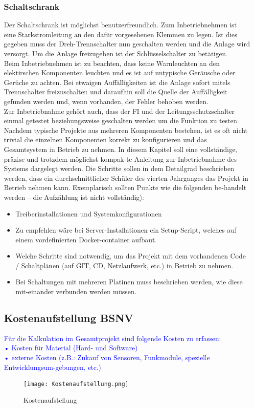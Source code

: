 \subsubsection{Schaltschrank}
    Der Schaltschrank ist möglichst benutzerfreundlich. Zum Inbetriebnehmen ist eine Starkstromleitung an den dafür vorgesehenen Klemmen zu legen. Ist dies gegeben muss der Dreh-Trennschalter nun geschalten werden und die Anlage wird versorgt. Um die Anlage freizugeben ist der Schlüsselschalter zu betätigen.\\
    Beim Inbetriebnehmen ist zu beachten, dass keine Warnleuchten an den elektirschen Komponenten leuchten und es ist auf untypische Geräusche oder Gerüche zu achten. Bei etwaigen Auffälligkeiten ist die Anlage sofort mitels Trennschalter freizuschalten und daraufhin soll die Quelle der Auffälligkeit gefunden werden und, wenn vorhanden, der Fehler behoben werden.\\
    Zur Inbetriebnahme gehört auch, dass der FI und der Leitungsschutzschalter einmal getestet beziehungsweise geschalten werden um die Funktion zu testen.\\
\color{blue}
Nachdem typische Projekte aus mehreren Komponenten bestehen, ist es oft nicht trivial die einzelnen Komponenten korrekt zu konfigurieren und das Gesamtsystem in Betrieb zu nehmen. In diesem Kapitel soll eine vollständige, präzise und trotzdem möglichst kompak-te Anleitung zur Inbetriebnahme des Systems dargelegt werden. Die Schritte sollen in dem Detailgrad beschrieben werden, dass ein durchschnittlicher Schüler des vierten Jahrganges das Projekt in Betrieb nehmen kann. Exemplarisch sollten Punkte wie die folgenden be-handelt werden – die Aufzählung ist nicht vollständig):
\begin{itemize}
    \item Treiberinstallationen und Systemkonfigurationen
    \item Zu empfehlen wäre bei Server-Installationen ein Setup-Script, welches auf einem vordefinierten Docker-container aufbaut.
    \item Welche Schritte sind notwendig, um das Projekt mit dem vorhandenen Code / Schaltplänen (auf GIT, CD, Netzlaufwerk, etc.) in Betrieb zu nehmen.
    \item Bei Schaltungen mit mehreren Platinen muss beschrieben werden, wie diese mit-einander verbunden werden müssen.
\end{itemize}
\color{black}

\newpage
\subsection{Kostenaufstellung BSNV}
\textcolor{blue}{Für die Kalkulation im Gesamtprojekt sind folgende Kosten zu erfassen: \\
•	Kosten für Material (Hard- und Software)\\
•	externe Kosten (z.B.: Zukauf von Sensoren, Funkmodule, spezielle Entwicklungsum-gebungen, etc.) 
}
\begin{figure}[h]
    \texttt{[image: Kostenaufstellung.png]}
    \centering
    \caption{Kostenaufstellung}
\end{figure}



